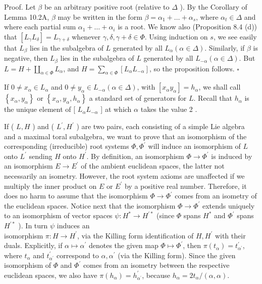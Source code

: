 \documentclass[10pt]{article}
\begin{document}
Proof. Let $\beta$ be an arbitrary positive root (relative to $\Delta$ ). By the Corollary of Lemma 10.2A, $\beta$ may be written in the form $\beta=\alpha_{1}+\ldots+\alpha_{s}$, where $\alpha_{t} \in \Delta$ and where each partial sum $\alpha_{1}+\ldots+\alpha_{i}$ is a root. We know also (Proposition 8.4 (d)) that $\left[L_{\gamma} L_{\delta}\right]=L_{\gamma+\delta}$ whenever $\gamma, \delta, \gamma+\delta \in \Phi$. Using induction on $s$, we see easily that $L_{\beta}$ lies in the subalgebra of $L$ generated by all $L_{\alpha}(\alpha \in \Delta)$. Similarly, if $\beta$ is negative, then $L_{\beta}$ lies in the subalgebra of $L$ generated by all $L_{-\alpha}(\alpha \in \Delta)$. But $L=H+\coprod_{\alpha \in \Phi} L_{\alpha}$, and $H=\sum_{\alpha \in \Phi}\left[L_{\alpha} L_{-\alpha}\right]$, so the proposition follows. $\square$

If $0 \neq x_{\alpha} \in L_{\alpha}$ and $0 \neq y_{\alpha} \in L_{-\alpha}(\alpha \in \Delta)$, with $\left[x_{\alpha} y_{\alpha}\right]=h_{\alpha}$, we shall call $\left\{x_{\alpha}, y_{\alpha}\right\}$ or $\left\{x_{\alpha}, y_{\alpha}, h_{\alpha}\right\}$ a standard set of generators for $L$. Recall that $h_{\alpha}$ is the unique element of [ $L_{\alpha} L_{-\alpha}$ ] at which $\alpha$ takes the value 2 .

If ( $L, H$ ) and ( $L^{\prime}, H^{\prime}$ ) are two pairs, each consisting of a simple Lie algebra and a maximal toral subalgebra, we want to prove that an isomorphism of the corresponding (irreducible) root systems $\Phi, \Phi^{\prime}$ will induce an isomorphism of $L$ onto $L^{\prime}$ sending $H$ onto $H^{\prime}$. By definition, an isomorphism $\Phi \rightarrow \Phi^{\prime}$ is induced by an isomorphism $E \rightarrow E^{\prime}$ of the ambient euclidean spaces, the latter not necessarily an isometry. However, the root system axioms are unaffected if we multiply the inner product on $E$ or $E^{\prime}$ by a positive real number. Therefore, it does no harm to assume that the isomorphism $\Phi \rightarrow \Phi^{\prime}$ comes from an isometry of the euclidean spaces. Notice next that the isomorphism $\Phi \rightarrow \Phi^{\prime}$ extends uniquely to an isomorphism of vector spaces $\psi: H^{*} \rightarrow H^{\prime *}$ (since $\Phi$ spans $H^{*}$ and $\Phi^{\prime}$ spans $H^{\prime *}$ ). In turn $\psi$ induces an\\
isomorphism $\pi: H \rightarrow H^{\prime}$, via the Killing form identification of $H, H^{\prime}$ with their duals. Explicitly, if $\alpha \mapsto \alpha^{\prime}$ denotes the given map $\Phi \mapsto \Phi^{\prime}$, then $\pi\left(t_{\alpha}\right)=t_{\alpha^{\prime}}^{\prime}$, where $t_{\alpha}$ and $t_{\alpha^{\prime}}^{\prime}$ correspond to $\alpha, \alpha^{\prime}$ (via the Killing form). Since the given isomorphism of $\Phi$ and $\Phi^{\prime}$ comes from an isometry between the respective euclidean spaces, we also have $\pi\left(h_{\alpha}\right)=h_{\alpha^{\prime}}^{\prime}$, because $h_{\alpha}=2 t_{\alpha} /(\alpha, \alpha)$.
\end{document}
